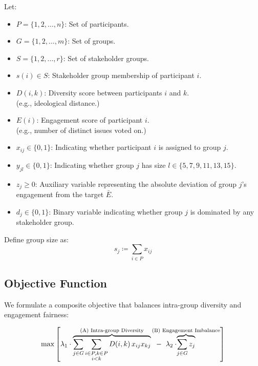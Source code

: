 Let:
\begin{itemize}
    \item $P = \{1, 2, \dots, n\}$: Set of participants.
    \item $G = \{1, 2, \dots, m\}$: Set of groups.
    \item $S = \{1, 2, \dots, r\}$: Set of stakeholder groups.
    \item $s(i) \in S$: Stakeholder group membership of participant $i$.
    \item $D(i,k)$: Diversity score between participants $i$ and $k$.\\(e.g., ideological distance.)
    \item $E(i)$: Engagement score of participant $i$.\\(e.g., number of distinct issues voted on.)
    \item $x_{ij} \in \{0,1\}$: Indicating whether participant $i$ is assigned to group $j$.
    \item $y_{jl} \in \{0,1\}$: Indicating whether group $j$ has size $l \in \{5,7,9,11,13,15\}$.
    \item $z_j \geq 0$: Auxiliary variable representing the absolute deviation of group $j$'s engagement from the target $\bar{E}$.
    \item $d_j \in \{0,1\}$: Binary variable indicating whether group $j$ is dominated by any stakeholder group.
\end{itemize}

Define group size as:
\[
s_j \coloneqq \sum_{i \in P} x_{ij}
\]

\subsection*{Objective Function}

We formulate a composite objective that balances intra-group diversity and engagement fairness:

\[
\max \left[
\lambda_1 \cdot \overbrace{
\sum_{j \in G} \sum_{\substack{i \in P, k \in P \\ i < k}} D(i,k)\,x_{ij} x_{kj}
  }^{\text{(A) Intra-group Diversity}}
\hspace{0.2cm} - \hspace{0.2cm} \lambda_2 \cdot \hspace{-1.3cm} \overbrace{
\sum_{j \in G} z_j
}^{\text{(B) Engagement Imbalance}}
\right]
\]

